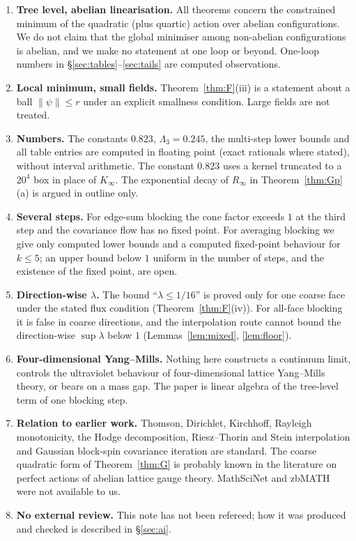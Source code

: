\documentclass[11pt,a4paper]{article}
\theoremstyle{definition}
\theoremstyle{remark}
\begin{document}
\begin{enumerate}[label=\arabic*.]
\item \textbf{Tree level, abelian linearisation.} All theorems concern the constrained minimum of the quadratic (plus quartic) action over abelian configurations. We do not claim that the global minimiser among non-abelian configurations is abelian, and we make no statement at one loop or beyond. One-loop numbers in \S\ref{sec:tables}--\ref{sec:tails} are computed observations.
\item \textbf{Local minimum, small fields.} Theorem~\ref{thm:F}(iii) is a statement about a ball $\|\psi\|\le r$ under an explicit smallness condition. Large fields are not treated.
\item \textbf{Numbers.} The constants $0.823$, $\Lambda_3=0.245$, the multi-step lower bounds and all table entries are computed in floating point (exact rationals where stated), without interval arithmetic. The constant $0.823$ uses a kernel truncated to a $20^4$ box in place of $K_\infty$. The exponential decay of $R_\infty$ in Theorem~\ref{thm:Gp}(a) is argued in outline only.
\item \textbf{Several steps.} For edge-sum blocking the cone factor exceeds $1$ at the third step and the covariance flow has no fixed point. For averaging blocking we give only computed lower bounds and a computed fixed-point behaviour for $k\le5$; an upper bound below $1$ uniform in the number of steps, and the existence of the fixed point, are open.
\item \textbf{Direction-wise $\lambda$.} The bound ``$\lambda\le1/16$'' is proved only for one coarse face under the stated flux condition (Theorem~\ref{thm:F}(iv)). For all-face blocking it is false in coarse directions, and the interpolation route cannot bound the direction-wise $\sup\lambda$ below $1$ (Lemmas~\ref{lem:mixed}, \ref{lem:floor}).
\item \textbf{Four-dimensional Yang--Mills.} Nothing here constructs a continuum limit, controls the ultraviolet behaviour of four-dimensional lattice Yang--Mills theory, or bears on a mass gap. The paper is linear algebra of the tree-level term of one blocking step.
\item \textbf{Relation to earlier work.} Thomson, Dirichlet, Kirchhoff, Rayleigh monotonicity, the Hodge decomposition, Riesz--Thorin and Stein interpolation and Gaussian block-spin covariance iteration are standard. The coarse quadratic form of Theorem~\ref{thm:G} is probably known in the literature on perfect actions of abelian lattice gauge theory. MathSciNet and zbMATH were not available to us.
\item \textbf{No external review.} This note has not been refereed; how it was produced and checked is described in \S\ref{sec:ai}.
\end{enumerate}
\end{document}
